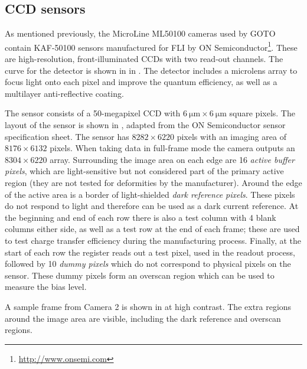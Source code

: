 \subsection{CCD sensors}
\label{sec:chip_layout}
\begin{colsection}

As mentioned previously, the MicroLine ML50100 cameras used by GOTO contain KAF-50100  sensors manufactured for FLI by ON Semiconductor\footnote{\url{http://www.onsemi.com}}. These are high-resolution, front-illuminated CCDs with two read-out channels. The  curve for the detector is shown in  in . The detector includes a microlens array to focus light onto each pixel and improve the quantum efficiency, as well as a multilayer anti-reflective coating.

The sensor consists of a 50-megapixel CCD with $\SI{6}{\micro\metre} \times \SI{6}{\micro\metre}$ square pixels. The layout of the sensor is shown in , adapted from the ON Semiconductor sensor specification sheet. The sensor has $8282 \times 6220$ pixels with an imaging area of $8176 \times 6132$ pixels. When taking data in full-frame mode the camera outputs an $8304 \times 6220$ array. Surrounding the image area on each edge are 16 \emph{active buffer pixels}, which are light-sensitive but not considered part of the primary active region (they are not tested for deformities by the manufacturer). Around the edge of the active area is a border of light-shielded \emph{dark reference pixels}. These pixels do not respond to light and therefore can be used as a dark current reference. At the beginning and end of each row there is also a test column with 4 blank columns either side, as well as a test row at the end of each frame; these are used to test charge transfer efficiency during the manufacturing process. Finally, at the start of each row the register reads out a test pixel, used in the readout process, followed by 10 \emph{dummy pixels} which do not correspond to physical pixels on the sensor. These dummy pixels form an overscan region which can be used to measure the bias level.

A sample frame from Camera 2 is shown in  at high contrast. The extra regions around the image area are visible, including the dark reference and overscan regions.


\end{colsection}

